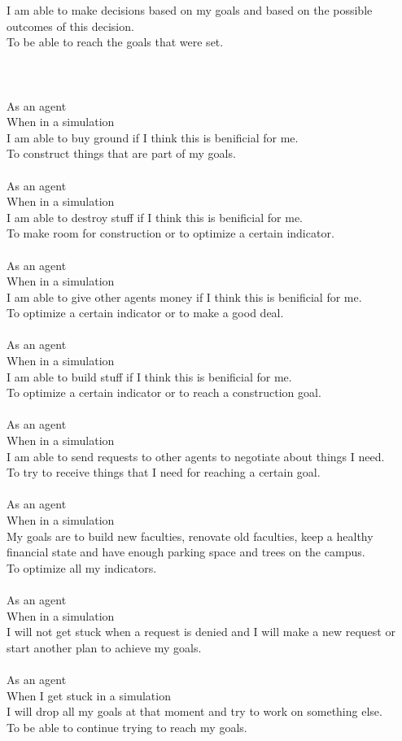 I am able to make decisions based on my goals and based on the possible outcomes of this decision.\\
To be able to reach the goals that were set.\\
\\
\\
\\
As an agent\\
When in a simulation\\
I am able to buy ground if I think this is benificial for me.\\
To construct things that are part of my goals.\\
\\
As an agent\\
When in a simulation\\
I am able to destroy stuff if I think this is benificial for me.\\
To make room for construction or to optimize a certain indicator.\\
\\
As an agent\\
When in a simulation\\
I am able to give other agents money if I think this is benificial for me.\\
To optimize a certain indicator or to make a good deal.\\
\\
As an agent\\
When in a simulation\\
I am able to build stuff if I think this is benificial for me.\\
To optimize a certain indicator or to reach a construction goal.\\
\\
As an agent\\
When in a simulation\\
I am able to send requests to other agents to negotiate about things I need.\\
To try to receive things that I need for reaching a certain goal.\\
\\
As an agent\\
When in a simulation\\
My goals are to build new faculties, renovate old faculties, keep a healthy financial state and have enough parking space and trees on the campus.\\
To optimize all my indicators.\\
\\
As an agent\\
When in a simulation\\
I will not get stuck when a request is denied and I will make a new request or start another plan to achieve my goals.\\
\\
As an agent\\
When I get stuck in a simulation\\
I will drop all my goals at that moment and try to work on something else.\\
To be able to continue trying to reach my goals.
\newpage
